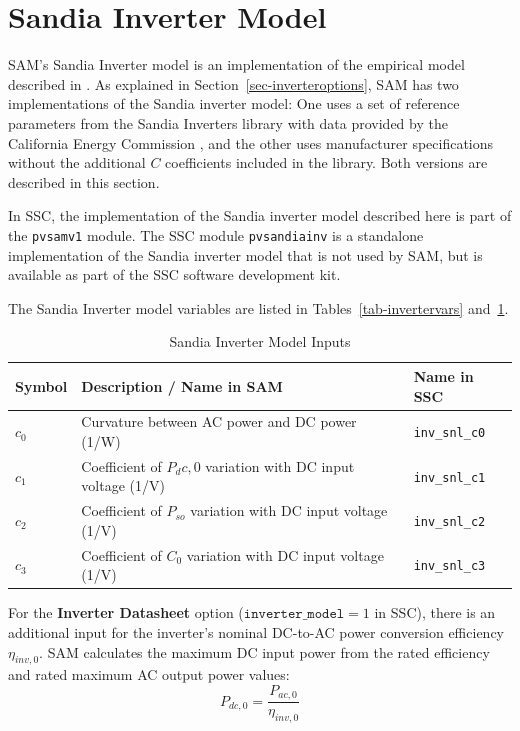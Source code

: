 \documentclass[12pt,letterpaper]{article}
\begin{document}
\section{Sandia Inverter Model}\label{sec-sandiainverter}

SAM's Sandia Inverter model is an implementation of the empirical model described in \citet{king2007}. As explained in Section~\ref{sec-inverteroptions}, SAM has two implementations of the Sandia inverter model: One uses  a set of reference parameters from the Sandia Inverters library with data provided by the California Energy Commission \citep{gsc2014a}, and the other uses manufacturer specifications without the additional $C$ coefficients included in the library. Both versions are described in this section.

In SSC, the implementation of the Sandia inverter model described here is part of the \texttt{pvsamv1} module. The SSC module \texttt{pvsandiainv} is a standalone implementation of the Sandia inverter model that is not used by SAM, but is available as part of the SSC software development kit.

The Sandia Inverter model variables are listed in Tables~\ref{tab-invertervars} and~\ref{tab-sandiainvertervars}.

\begin{table}
\begin{center}
\caption{Sandia Inverter Model Inputs}
\begin{tabular}{lll}
\midrule
Symbol & Description / \textbf{Name in SAM} & Name in SSC \\
\midrule
$c_0$ & Curvature between AC power and DC power (1/W) & \texttt{inv\_snl\_c0} \\
$c_1$ & Coefficient of $P_dc,0$ variation with DC input voltage (1/V) &  \texttt{inv\_snl\_c1} \\
$c_2$ & Coefficient of $P_{so}$ variation with DC input voltage (1/V) &\texttt{inv\_snl\_c2} \\
$c_3$ & Coefficient of $C_0$ variation with DC input voltage (1/V) & \texttt{inv\_snl\_c3} \\
\hline
\end{tabular}
\label{tab-sandiainvertervars}
\end{center}
\end{table}

For the \textbf{Inverter Datasheet} option ($\mathtt{inverter\_model}=1$ in SSC), there is an additional input for the inverter's nominal DC-to-AC power conversion efficiency $\eta_{inv,0}$. SAM calculates the maximum DC input power from the rated efficiency and rated maximum AC output power values:
\begin{equation}
P_{dc,0} = \frac{P_{ac,0}}{\eta_{inv,0}}
\end{equation}
\end{document}
